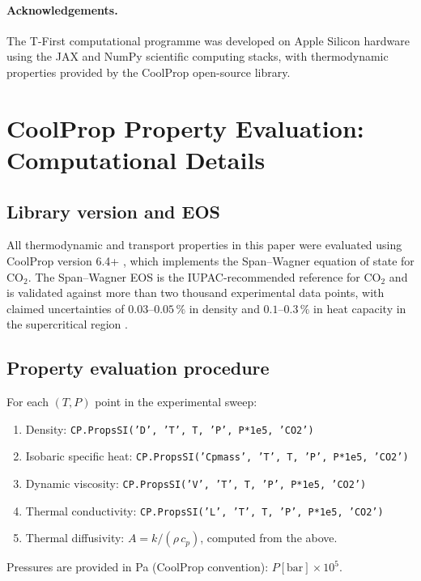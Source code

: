 \documentclass[12pt,a4paper]{article}
\begin{document}
\paragraph{Acknowledgements.}
The T-First computational programme was developed on Apple Silicon hardware using
the JAX and NumPy scientific computing stacks, with thermodynamic properties
provided by the CoolProp open-source library.

\appendix

\section{CoolProp Property Evaluation: Computational Details}
\label{app:coolprop}

\subsection{Library version and EOS}

All thermodynamic and transport properties in this paper were evaluated using
CoolProp version 6.4+ \citep{Bell2014}, which implements the Span--Wagner
equation of state \citep{Span1996} for CO$_2$.  The Span--Wagner EOS is the
IUPAC-recommended reference for CO$_2$ and is validated against more than
two thousand experimental data points, with claimed uncertainties of
$0.03$--$0.05\,\%$ in density and $0.1$--$0.3\,\%$ in heat capacity in the
supercritical region \citep{Span1996}.

\subsection{Property evaluation procedure}

For each $(T, P)$ point in the experimental sweep:
\begin{enumerate}[label=(\arabic*)]
  \item Density: \texttt{CP.PropsSI('D', 'T', T, 'P', P*1e5, 'CO2')}
  \item Isobaric specific heat: \texttt{CP.PropsSI('Cpmass', 'T', T, 'P', P*1e5, 'CO2')}
  \item Dynamic viscosity: \texttt{CP.PropsSI('V', 'T', T, 'P', P*1e5, 'CO2')}
  \item Thermal conductivity: \texttt{CP.PropsSI('L', 'T', T, 'P', P*1e5, 'CO2')}
  \item Thermal diffusivity: $A = k / (\rho\,c_p)$, computed from the above.
\end{enumerate}
Pressures are provided in \si{\pascal} (CoolProp convention): $P[\si{\bar}] \times 10^5$.
\end{document}
